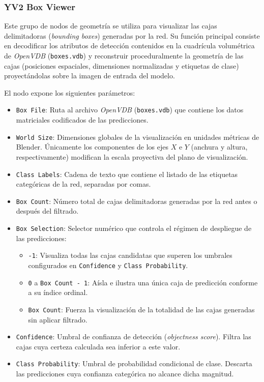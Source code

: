 \subsubsection{YV2 Box Viewer}
Este grupo de nodos de geometría se utiliza para visualizar las cajas delimitadoras (\textit{bounding boxes}) generadas por la red. Su función principal 
consiste en decodificar los atributos de detección contenidos en la cuadrícula volumétrica de \textit{OpenVDB} (\texttt{boxes.vdb}) y reconstruir proceduralmente 
la geometría de las cajas (posiciones espaciales, dimensiones normalizadas y etiquetas de clase) proyectándolas sobre la imagen de entrada del modelo.
\medskip

El nodo expone los siguientes parámetros:
\begin{itemize}
    \item \texttt{Box File}: Ruta al archivo \textit{OpenVDB} (\texttt{boxes.vdb}) que contiene los datos matriciales codificados de las predicciones.
    \item \texttt{World Size}: Dimensiones globales de la visualización en unidades métricas de Blender. Únicamente los componentes de los ejes $X$ e $Y$ 
    (anchura y altura, respectivamente) modifican la escala proyectiva del plano de visualización.
    \item \texttt{Class Labels}: Cadena de texto que contiene el listado de las etiquetas categóricas de la red, separadas por comas.
    \item \texttt{Box Count}: Número total de cajas delimitadoras generadas por la red antes o después del filtrado.
    \item \texttt{Box Selection}: Selector numérico que controla el régimen de despliegue de las predicciones:
    \begin{itemize}
        \item \texttt{-1}: Visualiza todas las cajas candidatas que superen los umbrales configurados en \texttt{Confidence} y \texttt{Class Probability}.
        \item \texttt{0} a \texttt{Box Count - 1}: Aísla e ilustra una única caja de predicción conforme a su índice ordinal.
        \item \texttt{Box Count}: Fuerza la visualización de la totalidad de las cajas generadas sin aplicar filtrado.
    \end{itemize}
    \item \texttt{Confidence}: Umbral de confianza de detección (\textit{objectness score}). Filtra las cajas cuya certeza calculada sea inferior a este valor.
    \item \texttt{Class Probability}: Umbral de probabilidad condicional de clase. Descarta las predicciones cuya confianza categórica no alcance dicha magnitud.
\end{itemize}

